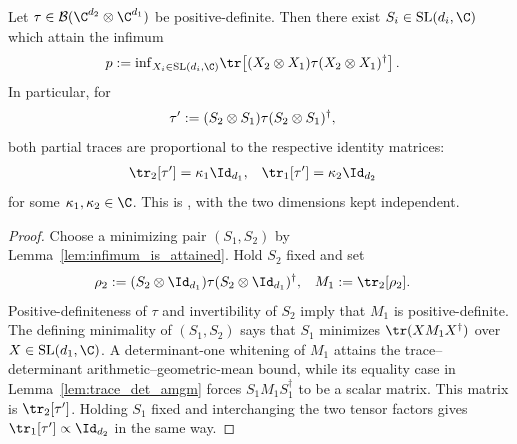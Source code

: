 \begin{theorem}
    \label{thm:exists_normal_form_generic_tau}
    \leanok
    Let $\tau\in\mathcal{B}(\C^{d_2}\otimes\C^{d_1})$ be positive-definite. Then
    there exist $S_i\in\mathrm{SL}(d_i,\C)$ which attain the infimum
    \begin{align}
        p
        &:={\inf}_{X_i\in\mathrm{SL}(d_i,\C)}
          \tr\!\left[(X_2\otimes X_1)\tau
          (X_2\otimes X_1)^\dagger\right].
        \label{eq:representations_generic_tau_infimum}
    \end{align}
    In particular, for
    \begin{align}
        \tau'
        &:=(S_2\otimes S_1)\tau(S_2\otimes S_1)^\dagger,
        \notag
    \end{align}
    both partial traces are proportional to the respective identity matrices:
    \begin{align}
        \tr_{2}[\tau']&=\kappa_1\Id_{d_1},
        &\tr_{1}[\tau']&=\kappa_2\Id_{d_2}
        \label{eq:representations_generic_tau_marginals}
    \end{align}
    for some $\kappa_1,\kappa_2\in\C$. This is
    \cite[Proposition~2.8, lines 894--919]{Wolf2012Quantum}, with the two
    dimensions kept independent.
\end{theorem}

\begin{proof}\leanok
    Choose a minimizing pair $(S_1,S_2)$ by
    Lemma~\ref{lem:infimum_is_attained}. Hold $S_2$ fixed and set
    \begin{align}
        \rho_2
        &:=(S_2\otimes\Id_{d_1})\tau
          (S_2\otimes\Id_{d_1})^\dagger,
        &M_1&:=\tr_2[\rho_2].
        \notag
    \end{align}
    Positive-definiteness of $\tau$ and invertibility of $S_2$ imply that
    $M_1$ is positive-definite. The defining minimality of $(S_1,S_2)$ says
    that $S_1$ minimizes $\tr(XM_1X^\dagger)$ over
    $X\in\mathrm{SL}(d_1,\C)$. A determinant-one whitening of $M_1$ attains
    the trace--determinant arithmetic--geometric-mean bound, while its equality
    case in Lemma~\ref{lem:trace_det_amgm} forces
    $S_1M_1S_1^\dagger$ to be a scalar matrix. This matrix is
    $\tr_2[\tau']$. Holding $S_1$ fixed and interchanging the two tensor
    factors gives $\tr_1[\tau']\propto\Id_{d_2}$ in the same way.
\end{proof}

